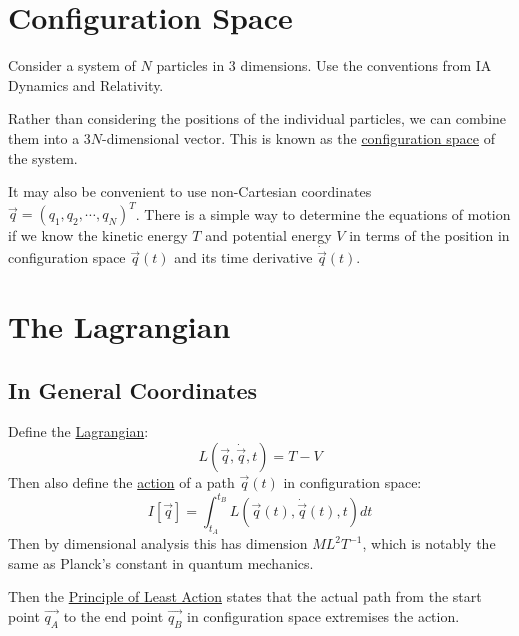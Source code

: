 \documentclass[../Main.tex]{subfiles}
\begin{document}
\section{Configuration Space}
Consider a system of $N$ particles in $3$ dimensions. Use the conventions from IA Dynamics and Relativity.

Rather than considering the positions of the individual particles, we can combine them into a $3N$-dimensional vector. This is known as the \underline{configuration space} of the system.

It may also be convenient to use non-Cartesian coordinates\\$\vec{q} = (q_1, q_2, \cdots, q_N)^T$. There is a simple way to determine the equations of motion if we know the kinetic energy $T$ and potential energy $V$ in terms of the position in configuration space $\vec{q}(t)$ and its time derivative $\dot{\vec{q}}(t)$.

\section{The Lagrangian}
\subsection{In General Coordinates}
Define the \underline{Lagrangian}:
\begin{equation}
    L(\vec{q}, \dot{\vec{q}}, t) = T - V
    \label{eqnLagrangian}
\end{equation}
Then also define the \underline{action} of a path $\vec{q}(t)$ in configuration space:
\begin{equation}
    I[\vec{q}] = \int_{t_A}^{t_B} L(\vec{q}(t), \dot{\vec{q}}(t), t)dt
    \label{eqnAction}
\end{equation}
Then by dimensional analysis this has dimension $ML^2T^{-1}$, which is notably the same as Planck's constant in quantum mechanics.

Then the \underline{Principle of Least Action} states that the actual path from the start point $\vec{q_A}$ to the end point $\vec{q_B}$ in configuration space extremises the action.
\end{document}
